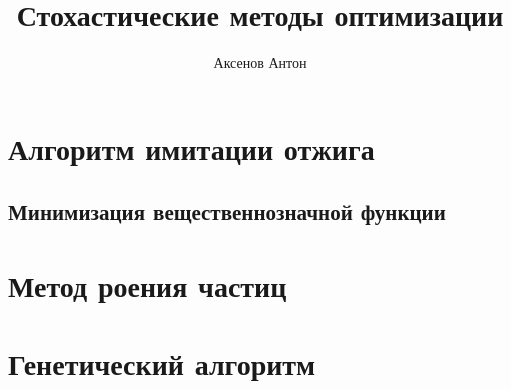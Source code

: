 \documentclass[a4paper,12pt]{article}
\author{Аксенов Антон}
\title{Стохастические методы оптимизации}
\date{}
\begin{document}
	\maketitle
	\section{Алгоритм имитации отжига}
	
	
	
	
	\subsection{Минимизация вещественнозначной функции}
	
	
	\newpage
	\section{Метод роения частиц}
	
	
	\newpage
	\section{Генетический алгоритм}
	
	
	
	
\end{document}
